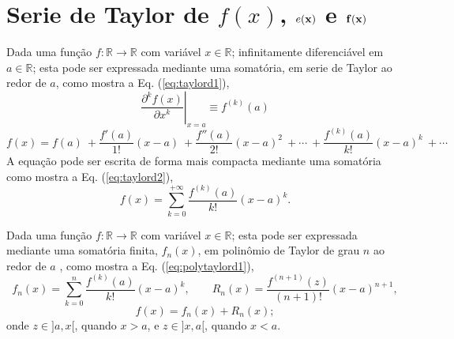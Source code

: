 
\section{Serie de Taylor de $f(x)$, $e(\VECTOR{x})$ e $\VECTOR{f}(\VECTOR{x})$}
\label{def:taylor}


\begin{proposition}\label{prop:taylord}
Dada uma função $f:\mathbb{R}\rightarrow \mathbb{R}$ com variável $x \in \mathbb{R}$;
infinitamente diferenciável em $a \in \mathbb{R}$;
esta pode ser expressada mediante uma somatória, em serie de Taylor 
\cite[pp. 734]{stewart2008calculus} \cite[pp. 281]{telles2015matematica} \cite{Taylor} 
ao redor de $a$, como
mostra a Eq. (\ref{eq:taylord1}),%
\begin{equation}\label{eq:taylord0a}
\left.\frac{\partial^k f(x)}{\partial x^k}\right|_{x=a}\equiv f^{(k)}(a) 
\end{equation}
\begin{equation}\label{eq:taylord1}
  f(x)=f(a)
      ~+\frac{f'(a)}{1!} (x-a)
      ~+\frac{f''(a)}{2!} (x-a)^{2}
      ~+\cdots 
      ~+\frac{f^{(k)}(a)}{k!} (x-a)^{k}
      ~+\cdots 
\end{equation}
A equação pode ser escrita de forma mais compacta mediante uma somatória  como mostra a Eq. (\ref{eq:taylord2}),
\begin{equation}\label{eq:taylord2}
  f(x)=\sum\limits_{k=0}^{+\infty} \frac{f^{(k)}(a)}{k!} (x-a)^{k}.
\end{equation}
\end{proposition}

\begin{proposition}\label{prop:polytaylor}
Dada uma função $f:\mathbb{R}\rightarrow \mathbb{R}$ com variável $x \in \mathbb{R}$;
esta pode ser expressada mediante uma somatória finita, $f_n(x)$, 
em polinômio de Taylor de grau $n$ ao redor de $a$
\cite[pp. 737]{stewart2008calculus} \cite[pp. 285]{telles2015matematica}, 
 como mostra a Eq. (\ref{eq:polytaylord1}),
\begin{equation}\label{eq:polytaylord1}
  f_n(x)=\sum\limits_{k=0}^{n} \frac{f^{(k)}(a)}{k!} (x-a)^{k},
\qquad
R_n(x)=\frac{f^{(n+1)}(z)}{(n+1)!} (x-a)^{n+1},
\end{equation}
\begin{equation}\label{eq:polytaylord2}
f(x)= f_n(x) + R_n(x);
\end{equation}
onde $z \in ]a,x[$, quando $x>a$, e $z \in ]x,a[$, quando $x<a$.
\end{proposition}


